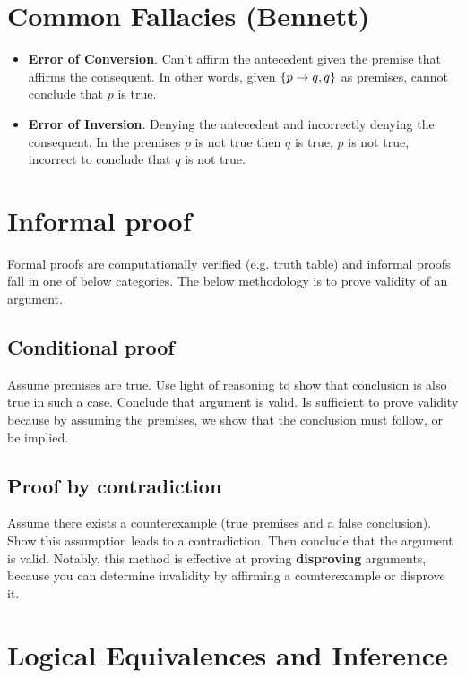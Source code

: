 \section{Common Fallacies (Bennett)}

\begin{itemize} 
    \item \textbf{Error of Conversion}. Can't affirm the antecedent given the premise that affirms the consequent. In other words, given $\{p\rightarrow q,q\}$ as premises, cannot conclude that $p$ is true.
    \item \textbf{Error of Inversion}. Denying the antecedent and incorrectly denying the consequent. In the premises $p$ is not true then $q$ is true, $p$ is not true, incorrect to conclude that $q$ is not true.
\end{itemize}

\section{Informal proof}

Formal proofs are computationally verified (e.g. truth table) and informal proofs fall in one of below categories.
The below methodology is to prove validity of an argument.

\subsection{Conditional proof}

Assume premises are true. Use light of reasoning to show that conclusion is also true in such a case. Conclude that argument is valid. Is sufficient to prove validity because by assuming the premises, we show that the conclusion must follow, or be implied.

\subsection{Proof by contradiction}

Assume there exists a counterexample (true premises and a false conclusion). Show this assumption leads to a contradiction. Then conclude that the argument is valid.
Notably, this method is effective at proving \textbf{disproving} arguments, because you can determine invalidity by affirming a counterexample or disprove it.

\section{Logical Equivalences and Inference}

